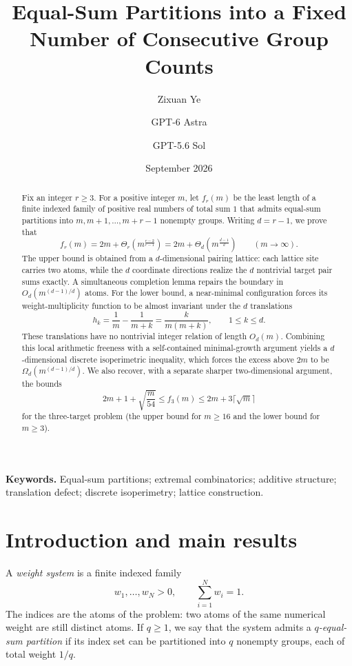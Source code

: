 \documentclass[11pt]{article}
\title{\textbf{Equal-Sum Partitions into a Fixed Number of Consecutive Group Counts}}
\author{Zixuan Ye \and GPT-6 Astra \and GPT-5.6 Sol}
\date{September 2026}
\theoremstyle{definition}
\newcommand{\1}{\mathbf{1}}
\begin{document}
\maketitle

\begin{abstract}
Fix an integer $r\ge 3$.  For a positive integer $m$, let $f_r(m)$ be the least length of a finite indexed family of positive real numbers of total sum $1$ that admits equal-sum partitions into $m,m+1,\ldots,m+r-1$ nonempty groups.  Writing $d=r-1$, we prove that
\[
  f_r(m)=2m+\Theta_r\!\left(m^{\frac{r-2}{r-1}}\right)
  =2m+\Theta_d\!\left(m^{\frac{d-1}{d}}\right)
  \qquad (m\to\infty).
\]
The upper bound is obtained from a $d$-dimensional pairing lattice: each lattice site carries two atoms, while the $d$ coordinate directions realize the $d$ nontrivial target pair sums exactly.  A simultaneous completion lemma repairs the boundary in $O_d(m^{(d-1)/d})$ atoms.  For the lower bound, a near-minimal configuration forces its weight-multiplicity function to be almost invariant under the $d$ translations
\[
  h_k=\frac1m-\frac1{m+k}=\frac{k}{m(m+k)},\qquad 1\le k\le d.
\]
These translations have no nontrivial integer relation of length $O_d(m)$.  Combining this local arithmetic freeness with a self-contained minimal-growth argument yields a $d$-dimensional discrete isoperimetric inequality, which forces the excess above $2m$ to be $\Omega_d(m^{(d-1)/d})$.  We also recover, with a separate sharper two-dimensional argument, the bounds
\[
  2m+1+\sqrt{\frac{m}{54}}\le f_3(m)\le 2m+3\lceil\sqrt m\rceil
\]
for the three-target problem (the upper bound for $m\ge16$ and the lower bound for $m\ge3$).
\end{abstract}

\medskip
\noindent\textbf{Keywords.} Equal-sum partitions; extremal combinatorics; additive structure; translation defect; discrete isoperimetry; lattice construction.

\section{Introduction and main results}

A \emph{weight system} is a finite indexed family
\[
  w_1,\ldots,w_N>0,\qquad \sum_{i=1}^N w_i=1.
\]
The indices are the atoms of the problem: two atoms of the same numerical weight are still distinct atoms.  If $q\ge1$, we say that the system admits a \emph{$q$-equal-sum partition} if its index set can be partitioned into $q$ nonempty groups, each of total weight $1/q$.
\end{document}
